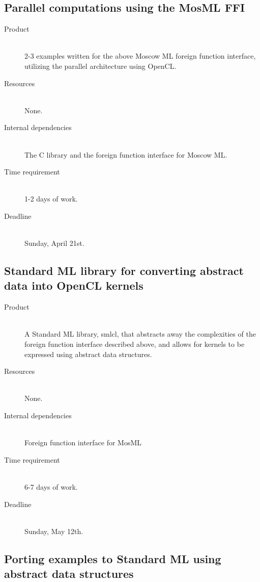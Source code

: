 \documentclass[a4paper, 10pt]{article}
\begin{document}
\subsection{Parallel computations using the MosML FFI}

\begin{description}
  \item[Product] \hfill \\
    2-3 examples written for the above Moscow ML foreign function
    interface, utilizing the parallel architecture using OpenCL.
  \item[Resources] \hfill \\
    None.
  \item[Internal dependencies] \hfill \\
    The C library and the foreign function interface for Moscow ML.
  \item[Time requirement] \hfill \\
    1-2 days of work.
  \item[Deadline] \hfill \\
    Sunday, April 21st.
\end{description}

\subsection{Standard ML library for converting abstract data into
  OpenCL kernels}

\begin{description}
  \item[Product] \hfill \\
    A Standard ML library, smlcl, that abstracts away the complexities of the
    foreign function interface described above, and allows for kernels
    to be expressed using abstract data structures.
  \item[Resources] \hfill \\
    None.
  \item[Internal dependencies] \hfill \\
    Foreign function interface for MosML
  \item[Time requirement] \hfill \\
    6-7 days of work.
  \item[Deadline] \hfill \\
    Sunday, May 12th.
\end{description}

\subsection{Porting examples to Standard ML using abstract data structures}
\end{document}
